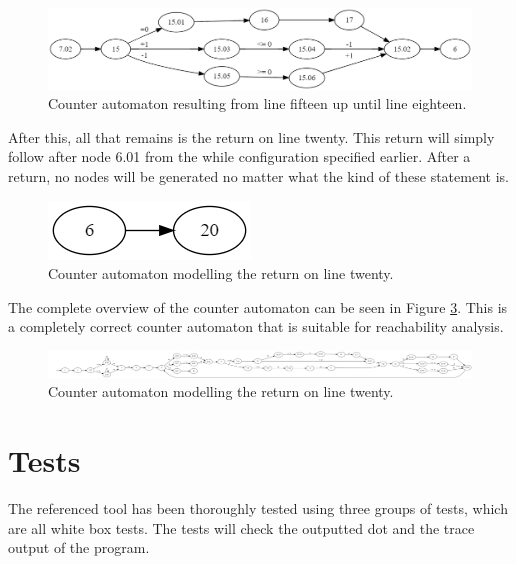 \documentclass[12pt]{article}
\begin{document}
\begin{figure}[h]
	\centering
	\includegraphics[width=\linewidth]{final_overview_9}
	\caption{Counter automaton resulting from line fifteen up until line eighteen.}
	\label{fig:final_overview_9}
\end{figure}

After this, all that remains is the return on line twenty. This return will simply follow after node 6.01 from the while configuration specified earlier. After a return, no nodes will be generated no matter what the kind of these statement is.

\begin{figure}[h]
	\centering
	\includegraphics[width=0.35\linewidth]{final_overview_10}
	\caption{Counter automaton modelling the return on line twenty.}
	\label{fig:final_overview_10}
\end{figure}

The complete overview of the counter automaton can be seen in Figure \ref{fig:final_overview_11}. This is a completely correct counter automaton that is suitable for reachability analysis.

\begin{landscape}
	\begin{figure}
		\centering
		\includegraphics[width=\linewidth]{final_overview_11}
		\caption{Counter automaton modelling the return on line twenty.}
		\label{fig:final_overview_11}
	\end{figure}
\end{landscape}

\section{Tests}
The referenced tool has been thoroughly tested using three groups of tests, which are all white box tests. The tests will check the outputted dot and the trace output of the program. 
\end{document}
